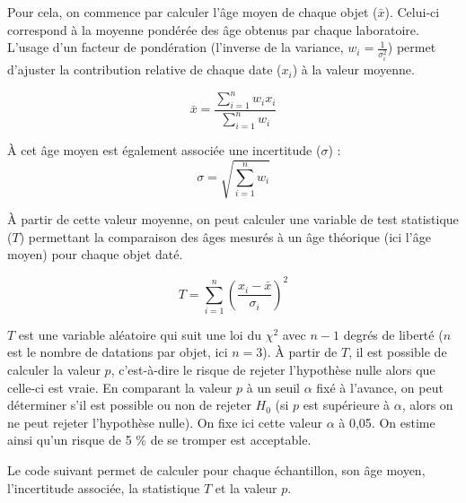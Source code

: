 \documentclass[
  french,
]{scrbook}
\begin{document}
Pour cela, on commence par calculer l'âge moyen de chaque objet (\(\bar{x}\)). Celui-ci correspond à la moyenne pondérée des âge obtenus par chaque laboratoire. L'usage d'un facteur de pondération (l'inverse de la variance, \(w_i = \frac{1}{\sigma_i^2}\)) permet d'ajuster la contribution relative de chaque date (\(x_i\)) à la valeur moyenne.

\[ \bar{x}  = \frac{\sum_{i=1}^{n}{w_i x_i}}{\sum_{i=1}^{n}{w_i}} \]

À cet âge moyen est également associée une incertitude (\(\sigma\)) :
\[ \sigma = \sqrt{\sum_{i=1}^{n}{w_i}} \]

À partir de cette valeur moyenne, on peut calculer une variable de test statistique (\(T\)) permettant la comparaison des âges mesurés à un âge théorique (ici l'âge moyen) pour chaque objet daté.

\[ T = \sum_{i=1}^{n}{\left( \frac{x_i - \bar{x}}{\sigma_i} \right)^2} \]

\(T\) est une variable aléatoire qui suit une loi du \(\chi^2\) avec \(n-1\) degrés de liberté (\(n\) est le nombre de datations par objet, ici \(n = 3\)). À partir de \(T\), il est possible de calculer la valeur \(p\), c'est-à-dire le risque de rejeter l'hypothèse nulle alors que celle-ci est vraie. En comparant la valeur \(p\) à un seuil \(\alpha\) fixé à l'avance, on peut déterminer s'il est possible ou non de rejeter \(H_0\) (si \(p\) est supérieure à \(\alpha\), alors on ne peut rejeter l'hypothèse nulle). On fixe ici cette valeur \(\alpha\) à 0,05. On estime ainsi qu'un risque de 5 \% de se tromper est acceptable.

Le code suivant permet de calculer pour chaque échantillon, son âge moyen, l'incertitude associée, la statistique \(T\) et la valeur \(p\).
\end{document}
